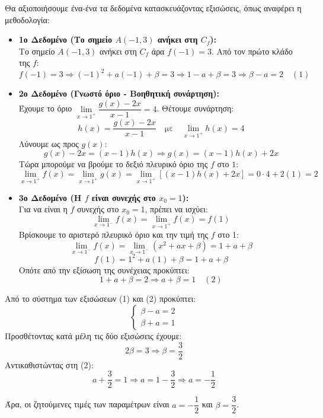 \lysh
Θα αξιοποιήσουμε ένα-ένα τα δεδομένα κατασκευάζοντας εξισώσεις, όπως αναφέρει η μεθοδολογία:
\begin{itemize}
\item \textbf{1ο Δεδομένο (Το σημείο $A(-1, 3)$ ανήκει στη $C_f$):} \\
Το σημείο $A(-1, 3)$ ανήκει στη $C_f$ άρα $f(-1) = 3$. Από τον πρώτο κλάδο της $f$:
\[ f(-1) = 3 \Rightarrow (-1)^2 + a(-1) + \beta = 3 \Rightarrow 1 - a + \beta = 3 \Rightarrow \beta - a = 2 \quad (1) \]

\item \textbf{2ο Δεδομένο (Γνωστό όριο - Βοηθητική συνάρτηση):} \\
Έχουμε το όριο $\lim\limits_{x\to 1^+} \dfrac{g(x) - 2x}{x-1} = 4$. Θέτουμε συνάρτηση:
\[ h(x) = \dfrac{g(x) - 2x}{x-1} \quad \text{με} \quad \lim\limits_{x\to 1^+} h(x) = 4 \]
Λύνουμε ως προς $g(x)$:
\[ g(x) - 2x = (x-1)h(x) \Rightarrow g(x) = (x-1)h(x) + 2x \]
Τώρα μπορούμε να βρούμε το δεξιό πλευρικό όριο της $f$ στο $1$:
\[ \lim\limits_{x\to 1^+} f(x) = \lim\limits_{x\to 1^+} g(x) = \lim\limits_{x\to 1^+} \left[ (x-1)h(x) + 2x \right] = 0 \cdot 4 + 2(1) = 2 \]

\item \textbf{3ο Δεδομένο (Η $f$ είναι συνεχής στο $x_0 = 1$):} \\
Για να είναι η $f$ συνεχής στο $x_0=1$, πρέπει να ισχύει:
\[ \lim\limits_{x\to 1^-} f(x) = \lim\limits_{x\to 1^+} f(x) = f(1) \]
Βρίσκουμε το αριστερό πλευρικό όριο και την τιμή της $f$ στο 1:
\[ \lim\limits_{x\to 1^-} f(x) = \lim\limits_{x\to 1^-} (x^2 + ax + \beta) = 1 + a + \beta \]
\[ f(1) = 1^2 + a(1) + \beta = 1 + a + \beta \]
Οπότε από την εξίσωση της συνέχειας προκύπτει:
\[ 1 + a + \beta = 2 \Rightarrow a + \beta = 1 \quad (2) \]
\end{itemize}

Από το σύστημα των εξισώσεων (1) και (2) προκύπτει:
\[ \begin{cases} \beta - a = 2 \\ \beta + a = 1 \end{cases} \]
Προσθέτοντας κατά μέλη τις δύο εξισώσεις έχουμε: 
\[ 2\beta = 3 \Rightarrow \beta = \dfrac{3}{2} \]
Αντικαθιστώντας στη (2): 
\[ a + \dfrac{3}{2} = 1 \Rightarrow a = 1 - \dfrac{3}{2} \Rightarrow a = -\dfrac{1}{2} \]

Άρα, οι ζητούμενες τιμές των παραμέτρων είναι $a = -\dfrac{1}{2}$ και $\beta = \dfrac{3}{2}$.
